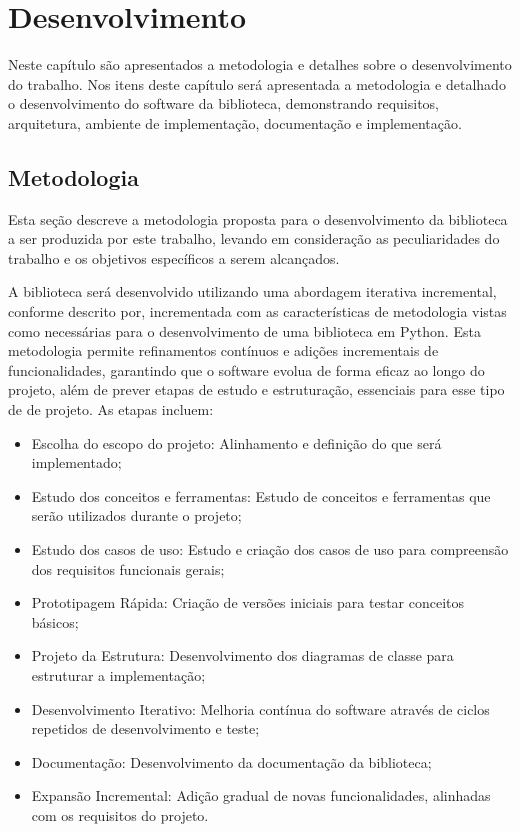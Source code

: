 \chapter{Desenvolvimento}
Neste capítulo são apresentados a metodologia e detalhes sobre o desenvolvimento do trabalho.
Nos itens deste capítulo será apresentada a metodologia e detalhado o desenvolvimento do software da biblioteca,
demonstrando requisitos, arquitetura, ambiente de implementação, documentação e implementação.


\section{Metodologia}
Esta seção descreve a metodologia proposta para o desenvolvimento da biblioteca a ser produzida por este trabalho,
levando em consideração as peculiaridades do trabalho e os objetivos específicos a serem alcançados.

A biblioteca será desenvolvido utilizando uma abordagem iterativa incremental, conforme descrito por, \cite{met}
incrementada com as características de metodologia vistas como necessárias para o desenvolvimento de uma biblioteca em
Python.
Esta metodologia permite refinamentos contínuos e adições incrementais de funcionalidades, garantindo que o software
evolua de forma eficaz ao longo do projeto, além de prever etapas de estudo e estruturação, essenciais para esse
tipo de de projeto.
As etapas incluem:

\begin{itemize}
    \item Escolha do escopo do projeto: Alinhamento e definição do que será implementado;
    \item Estudo dos conceitos e ferramentas: Estudo de conceitos e ferramentas que serão utilizados durante o projeto;
    \item Estudo dos casos de uso: Estudo e criação dos casos de uso para compreensão dos requisitos funcionais gerais;
    \item Prototipagem Rápida: Criação de versões iniciais para testar conceitos básicos;
    \item Projeto da Estrutura: Desenvolvimento dos diagramas de classe para estruturar a implementação;
    \item Desenvolvimento Iterativo: Melhoria contínua do software através de ciclos repetidos de desenvolvimento e teste;
    \item Documentação: Desenvolvimento da documentação da biblioteca;
    \item Expansão Incremental: Adição gradual de novas funcionalidades, alinhadas com os requisitos do projeto.
\end{itemize}

